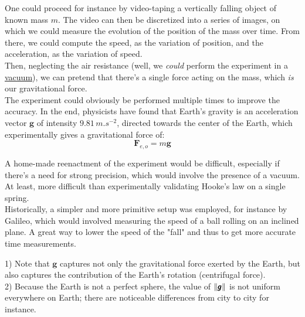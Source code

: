 \documentclass[solutions.tex]{subfiles}
\renewcommand{\bm}[1]{\pmb{#1}}
\begin{document}
One could proceed for instance by video-taping a vertically falling
object of known mass $m$. The video can then be discretized into a series
of images, on which we could measure the evolution of the position
of the mass over time. From there, we could compute the speed, as the
variation of position, and the acceleration, as the variation of
speed. \\

Then, neglecting the air resistance (well, we \textit{could} perform
the experiment in a  \href{https://en.wikipedia.org/wiki/Vacuum}{vacuum}),
we can pretend that there's a single force acting on the mass, which
\textit{is} our gravitational force. \\

The experiment could obviously be performed multiple times to
improve the accuracy. In the end, physicists have found that
Earth's gravity is an acceleration vector $\bm{g}$ of intensity
$9.81\,m.s^{-2}$, directed towards the center of the Earth, which
experimentally gives a gravitational force of:
\[ \bm{F}_{e,o} = m\bm{g} \]

\begin{remark}\label{rem:test} A home-made reenactment of the experiment would be
difficult, especially if there's a need for strong precision, which
would involve the presence of a vacuum. At least, more difficult
than experimentally validating Hooke's law on a single spring. \\

Historically, a simpler and more primitive setup was employed, for
instance by Galileo, which would involved measuring the speed of
a ball rolling on an inclined plane. A great way to lower the speed
of the "fall" and thus to get more accurate time measurements.
\end{remark}

\begin{remark} 1) Note that $\bm{g}$ captures not only
the gravitational force exerted by the Earth, but also captures
the contribution of the Earth's rotation (centrifugal force). \\

2) Because the Earth is not a perfect sphere, the value of
$\norm{\bm{g}}$ is not uniform everywhere on Earth; there are
noticeable differences from city to city for instance.
\end{remark}
\end{document}
